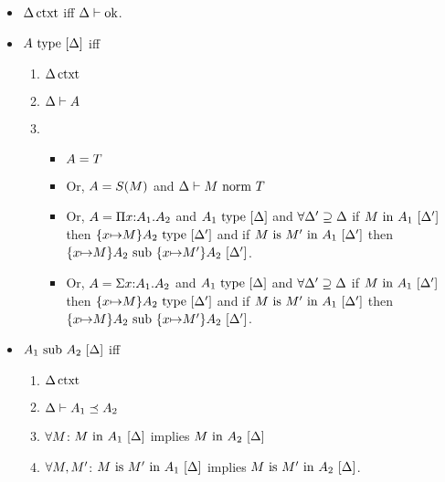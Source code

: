 \documentclass{article}
\theoremstyle{break}
\begin{document}
\begin{itemize}


\item
$\semanticcontext{\world}$ iff
$\validcontext{\world}$.

\item
$\semanticvalidtype{\world}{\kind}$ iff
\begin{enumerate}
\item $\semanticcontext{\world}$
\item $\validkind{\world}{\kind}$
\item
\begin{itemize}{}
\item $\kind = \ktype$
\item Or, $\kind = \ksingleton{\constructor}$ and 
$\normterm{\world}{\constructor}{\ktype}$
\item Or, $\kind = \kpi{\evar}{\kind_1}{\kind_2}$ and
$\semanticvalidtype{\world}{\kind_1}$ and
$\forall \world'\supseteq\world$ if $\semanticvalidterm{\world'}{\constructor}{\kind_1}$
then $\semanticvalidtype{\world'}{\substitute{\cvar}{\constructor}{\kind_2}}$ and
if $\semanticequivterm{\world'}{\constructor}{\constructor'}{\kind_1}$ then
$\semanticsubtype{\world'}{\substitute{\cvar}{\constructor}{\kind_2}}{\substitute{\cvar}{\constructor'}{\kind_2}}$.
\item Or, $\kind = \ksigma{\evar}{\kind_1}{\kind_2}$ and
$\semanticvalidtype{\world}{\kind_1}$ and
$\forall \world'\supseteq\world$ if $\semanticvalidterm{\world'}{\constructor}{\kind_1}$
then $\semanticvalidtype{\world'}{\substitute{\cvar}{\constructor}{\kind_2}}$ and
if $\semanticequivterm{\world'}{\constructor}{\constructor'}{\kind_1}$ then
$\semanticsubtype{\world'}{\substitute{\cvar}{\constructor}{\kind_2}}{\substitute{\cvar}{\constructor'}{\kind_2}}$.
\end{itemize}
\end{enumerate}

\item $\semanticsubtype{\world}{\kind_1}{\kind_2}$ iff
\begin{enumerate}
\item $\semanticcontext{\world}$
\item $\subkind{\world}{\kind_1}{\kind_2}$
\item $\forall \constructor$: $\semanticvalidterm{\world}{\constructor}{\kind_1}$ implies
$\semanticvalidterm{\world}{\constructor}{\kind_2}$
\item $\forall \constructor,\constructor'$: 
$\semanticequivterm{\world}{\constructor}{\constructor'}{\kind_1}$ implies
$\semanticequivterm{\world}{\constructor}{\constructor'}{\kind_2}$.
\end{enumerate}


\end{itemize}
\end{document}
